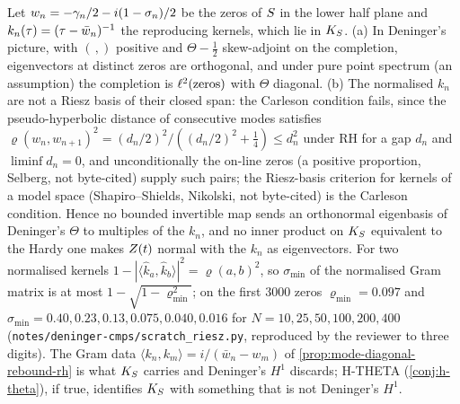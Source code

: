\begin{theorem}
\label{thm:ks-not-deninger-h1}
Let $w_n = -\gamma_{n}/2-i(1-\sigma_n)/2$ be the zeros of $S$ in the lower half plane and $k_n(\tau) = (\tau-\bar w_n)^{-1}$
the reproducing kernels, which lie in $K_S$. (a) In Deninger's picture, with $(\,,)$ positive and $\Theta-\tfrac12$
skew-adjoint on the completion, eigenvectors at distinct zeros are orthogonal, and under pure point spectrum (an
assumption) the completion is $\ell^2(\text{zeros})$ with $\Theta$ diagonal. (b) The normalised $k_n$ are not a Riesz
basis of their closed span: the Carleson condition fails, since the pseudo-hyperbolic distance of consecutive modes
satisfies $\varrho(w_n,w_{n+1})^2 = (d_n/2)^2/((d_n/2)^2+\tfrac14)\le d_n^2$ under RH for a gap $d_n$ and %
$\liminf d_n = 0$, and unconditionally the on-line zeros (a positive proportion, Selberg, not byte-cited) supply such
pairs; the Riesz-basis criterion for kernels of a model space (Shapiro--Shields, Nikolski, not byte-cited) is the
Carleson condition. Hence no bounded invertible map sends an orthonormal eigenbasis of Deninger's $\Theta$ to
multiples of the $k_n$, and no inner product on $K_S$ equivalent to the Hardy one makes $Z(t)$ normal with the $k_n$
as eigenvectors. For two normalised kernels $1-|\langle\hat k_a,\hat k_b\rangle|^2 = \varrho(a,b)^2$, so %
$\sigma_{\min}$ of the normalised Gram matrix is at most $1-\sqrt{1-\varrho_{\min}^2}$; on the first $3000$ zeros %
$\varrho_{\min} = 0.097$ and $\sigma_{\min} = 0.40, 0.23, 0.13, 0.075, 0.040, 0.016$ for $N = 10, 25, 50, 100, 200, 400$ %
(\texttt{notes/deninger-cmps/scratch\_riesz.py}, reproduced by the reviewer to three digits). The Gram data
$\langle k_n,k_m\rangle = i/(\bar w_n-w_m)$ of \cref{prop:mode-diagonal-rebound-rh} is what $K_S$ carries and
Deninger's $H^1$ discards; H-THETA (\cref{conj:h-theta}), if true, identifies $K_S$ with something that is not
Deninger's $H^1$.
\end{theorem}

